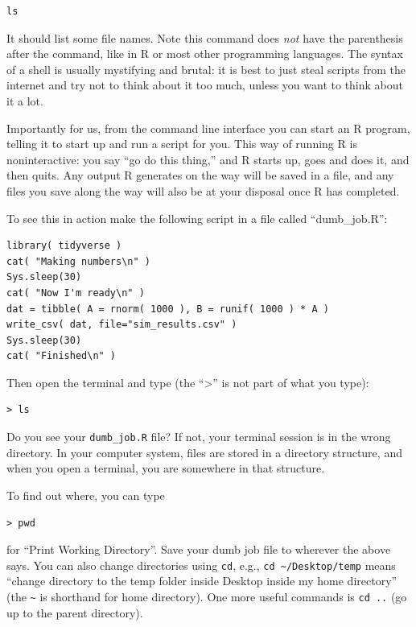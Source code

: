 \documentclass[
]{book}
\begin{document}
\begin{verbatim}
ls
\end{verbatim}

It should list some file names.
Note this command does \emph{not} have the parenthesis after the command, like in R or most other programming languages.
The syntax of a shell is usually mystifying and brutal: it is best to just steal scripts from the internet and try not to think about it too much, unless you want to think about it a lot.

Importantly for us, from the command line interface you can start an R program, telling it to start up and run a script for you.
This way of running R is noninteractive: you say ``go do this thing,'' and R starts up, goes and does it, and then quits.
Any output R generates on the way will be saved in a file, and any files you save along the way will also be at your disposal once R has completed.

To see this in action make the following script in a file called ``dumb\_job.R'':

\begin{verbatim}
library( tidyverse )
cat( "Making numbers\n" )
Sys.sleep(30)
cat( "Now I'm ready\n" )
dat = tibble( A = rnorm( 1000 ), B = runif( 1000 ) * A )
write_csv( dat, file="sim_results.csv" )
Sys.sleep(30)
cat( "Finished\n" )
\end{verbatim}

Then open the terminal and type (the ``\textgreater{}'' is not part of what you type):

\begin{verbatim}
> ls
\end{verbatim}

Do you see your \texttt{dumb\_job.R} file? If not, your terminal session is in the wrong directory.
In your computer system, files are stored in a directory structure, and when you open a terminal, you are somewhere in that structure.

To find out where, you can type

\begin{verbatim}
> pwd
\end{verbatim}

for ``Print Working Directory''.
Save your dumb job file to wherever the above says.
You can also change directories using \texttt{cd}, e.g., \texttt{cd\ \textasciitilde{}/Desktop/temp} means ``change directory to the temp folder inside Desktop inside my home directory'' (the \texttt{\textasciitilde{}} is shorthand for home directory).
One more useful commands is \texttt{cd\ ..} (go up to the parent directory).
\end{document}
